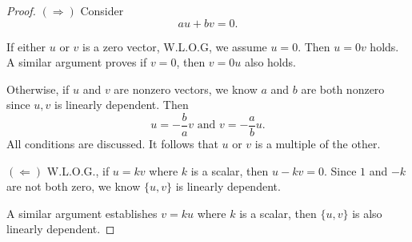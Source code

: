 \begin{Exercise}
\begin{proof}
$(\Longrightarrow)$
Consider
$$
a u+b v = 0.
$$

If either $u$ or $v$ is a zero vector, W.L.O.G, we assume $u=0$. Then $u = 0v$ holds. A similar argument proves if $v=0$, then $v = 0u$ also holds.

Otherwise, if $u$ and $v$ are nonzero vectors, we know $a$ and $b$ are both nonzero since ${u,v}$ is linearly dependent. Then
$$
u=-\frac{b}{a}v \text{ and } v=-\frac{a}{b}u.
$$
All conditions are discussed. It follows that $u$ or $v$ is a multiple of the other.

\vspace{2ex}

$(\Longleftarrow)$
W.L.O.G., if $u=k v$ where $k$ is a scalar, then $u-k v=0$. Since $1$ and $-k$ are not both zero, we know $\{u,v\}$ is linearly dependent.

A similar argument establishes $v=k u$ where $k$ is a scalar, then $\{u,v\}$ is also linearly dependent.
\end{proof}
\end{Exercise}